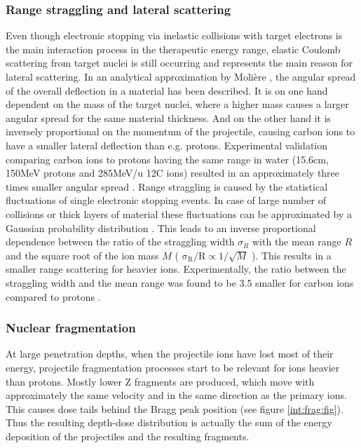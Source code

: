 \subsubsection{Range straggling and lateral scattering}
\label{scat}
Even though electronic stopping via inelastic collisions with target electrons is the main interaction process in the therapeutic energy 
range, elastic Coulomb scattering from target nuclei is still occurring and represents the main reason for lateral scattering. In an analytical 
approximation by Moli\`{e}re \cite{Mol48}, the angular spread of the overall deflection in a material has been described. It is 
on one hand dependent on the mass of the target nuclei, where a higher mass causes a larger angular spread for the same material thickness. 
And on the other hand it is inversely proportional on the momentum of the projectile, causing carbon ions to have a smaller 
lateral deflection than e.g. protons. Experimental validation comparing carbon ions to protons having the same range in water 
(15.6cm, 150MeV protons and 285MeV/u 12C ions) resulted in an approximately three times smaller angular spread \cite{Sch10}.\newline
\newline
Range straggling is caused by the statistical fluctuations of single electronic stopping events. In case of large number of collisions or 
thick layers of material these fluctuations can be approximated by a Gaussian probability distribution \cite{Bor40} 
\cite{Ahl80, Ric12}. This leads to an inverse proportional dependence between the ratio of the straggling width $\sigma_{R}$ with 
the mean range $R$ and the square root of the ion mass $M$ ( $\mathrm{\sigma_{R}}/\mathrm{R} \propto \mathrm{1}/{\sqrt{M}}$ ). This results 
in a smaller range scattering for heavier ions. Experimentally, the ratio between the straggling width and the mean range was found to be 
3.5 smaller for carbon ions compared to protons \cite{Sch10}.


\subsubsection{Nuclear fragmentation}
\label{intro:nt}
At large penetration depths, when the projectile ions have lost most of their energy, projectile fragmentation processes start to be 
relevant for ions heavier than protons. Mostly lower Z fragments are produced, which move with approximately the same velocity 
and in the same direction as the primary ions. This causes dose tails behind the Bragg peak position (see figure \ref{int:frag:fig}). 
Thus the resulting depth-dose distribution is actually the sum of the energy deposition of the projectiles and the resulting 
fragments. 

